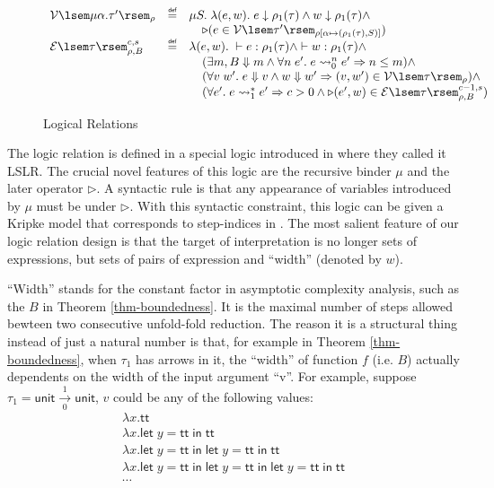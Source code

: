 \documentclass[preprint]{sigplanconf}
\newcommand{\arrow}[4]{#1\xrightarrow[#3]{#2}#4}
\newcommand{\symlet}{\mathsf{let\;}}
\newcommand{\symin}{\mathsf{\;in\;}}
\newcommand{\symtt}{\mathsf{tt}}
\newcommand{\symunit}{\mathsf{unit}}
\newcommand{\relV}[1]{\mathcal{V}\lsem#1\rsem}
\newcommand{\relE}[1]{\mathcal{E}\lsem#1\rsem}
\newcommand{\later}{\triangleright}
\newcommand\defeq{\mathrel{\overset{\makebox[0pt]{\mbox{\normalfont\tiny\sffamily def}}}{=}}}
\begin{document}
\begin{figure}
$$\begin{array}{lcl}
  \relV{\mu\alpha.\tau'}_\rho &\defeq& \mu S.\;\lambda (e,w).\; e \downarrow \rho_1(\tau) \wedge w \downarrow \rho_1(\tau) \wedge \\
  & & \hspace{.15in} \later (e \in \relV{\tau'}_{\rho[\alpha\mapsto(\rho_1(\tau),S)]}) \\
  \relE{\tau}^{c,s}_{\rho,B} &\defeq& \lambda(e,w).\;\vdash e:\rho_1(\tau) \wedge \vdash w:\rho_1(\tau) \wedge \\
  & & \hspace{.15in} (\exists m, B \Downarrow m \wedge \forall n\;e'.\; e\leadsto^n_0 e' \Rightarrow n \leq m) \wedge \\
  & & \hspace{.15in} (\forall v\;w'.\; e\Downarrow v \wedge w\Downarrow w'\Rightarrow (v,w') \in \relV{\tau}_\rho) \wedge \\
  & & \hspace{.15in} (\forall e'.\; e\leadsto^*_1 e' \Rightarrow c > 0 \wedge \later (e',w)\in \relE{\tau}^{c-1,s}_{\rho,B})
\end{array}
$$
\caption{\label{lrel}Logical Relations}
\end{figure}

The logic relation is defined in a special logic introduced in \cite{dreyer2009logical} where they called it LSLR. The crucial novel features of this logic are the recursive binder $\mu$ and the later operator $\later$. A syntactic rule is that any appearance of variables introduced by $\mu$ must be under $\later$. With this syntactic constraint, this logic can be given a Kripke model that corresponds to step-indices in \cite{step-index}. The most salient feature of our logic relation design is that the target of interpretation is no longer sets of expressions, but sets of pairs of expression and ``width'' (denoted by $w$).

``Width'' stands for the constant factor in asymptotic complexity analysis, such as the $B$ in Theorem \ref{thm-boundedness}. It is the maximal number of steps allowed bewteen two consecutive unfold-fold reduction. The reason it is a structural thing instead of just a natural number is that, for example in Theorem \ref{thm-boundedness}, when $\tau_1$ has arrows in it, the ``width'' of function $f$ (i.e. $B$) actually dependents on the width of the input argument ``v''. For example, suppose $\tau_1=\arrow{\symunit}{1}{0}{\symunit}$, $v$ could be any of the following values:
$$
\begin{array}{l}
  \lambda x.\symtt \\
  \lambda x.\symlet y=\symtt\symin\symtt \\
  \lambda x.\symlet y=\symtt\symin\symlet y=\symtt\symin\symtt \\
  \lambda x.\symlet y=\symtt\symin\symlet y=\symtt\symin\symlet y=\symtt\symin\symtt \\
  \cdots
\end{array}
$$
\end{document}
